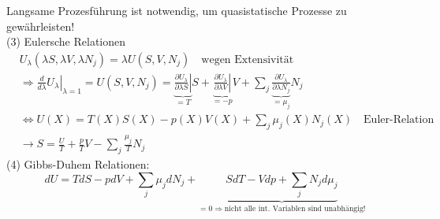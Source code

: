\documentclass[10pt,article,colorback,accentcolor=tud9d]{scrartcl}
\begin{document}
\begin{fleqn}
Langsame Prozesführung ist notwendig, um quasistatische Prozesse zu gewährleisten!\\
(3) Eulersche Relationen
  \begin{equation}
  \begin{aligned}
  &U_\lambda(\lambda S,\lambda V,\lambda N_j)=\lambda U(S,V,N_j) \quad \text{wegen Extensivität}\\
  &\Rightarrow \left.\frac{d}{d\lambda}U_\lambda\right|_{\lambda = 1} =U(S,V,N_j) = \underbrace{\left.\frac{\partial U_\lambda}{\partial \lambda S}\right|}_{=T} S +\underbrace{\left.\frac{\partial U_\lambda}{\partial \lambda V}\right|}_{=-p} V +\sum_j \underbrace{\frac{\partial U_\lambda}{\partial \lambda N_j}}_{=\mu_j} N_j\\
  &\Leftrightarrow U(X) =T(X)S(X)-p(X)V(X)+\sum_j \mu_j(X) N_j(X) \quad \text{Euler-Relation}\\
  &\rightarrow S= \frac{U}{T}+\frac{p}{T}V -\sum_j\frac{\mu_j}{T}N_j
  \end{aligned}
  \end{equation}
(4) Gibbs-Duhem Relationen:
  \begin{equation}
   dU=TdS -pdV+\sum_j\mu_jdN_j +\underbrace{SdT-Vdp+\sum_jN_jd\mu_j}_{=0\Rightarrow\text{nicht alle int. Variablen sind unabhängig!}}
  \end{equation}

\end{fleqn}
\end{document}
